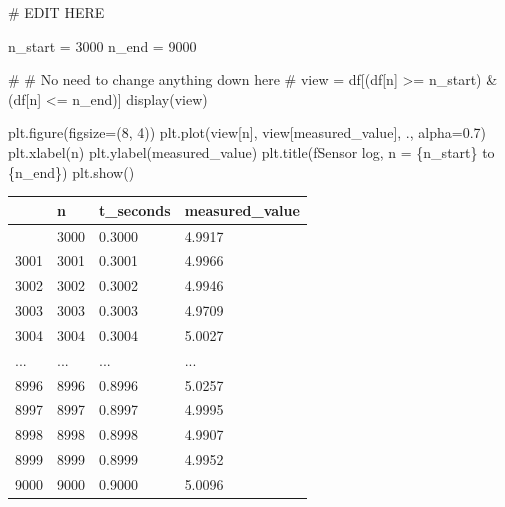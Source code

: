\documentclass[
  letterpaper,
  DIV=11,
  numbers=noendperiod]{scrreprt}
\newenvironment{Shaded}{\begin{snugshade}}{\end{snugshade}}
\newcommand{\CommentTok}[1]{\textcolor[rgb]{0.37,0.37,0.37}{#1}}
\newcommand{\DecValTok}[1]{\textcolor[rgb]{0.68,0.00,0.00}{#1}}
\newcommand{\FloatTok}[1]{\textcolor[rgb]{0.68,0.00,0.00}{#1}}
\newcommand{\NormalTok}[1]{\textcolor[rgb]{0.00,0.23,0.31}{#1}}
\newcommand{\OperatorTok}[1]{\textcolor[rgb]{0.37,0.37,0.37}{#1}}
\newcommand{\SpecialCharTok}[1]{\textcolor[rgb]{0.37,0.37,0.37}{#1}}
\newcommand{\SpecialStringTok}[1]{\textcolor[rgb]{0.13,0.47,0.30}{#1}}
\newcommand{\StringTok}[1]{\textcolor[rgb]{0.13,0.47,0.30}{#1}}
\newcounter{none} %
\theoremstyle{plain}
\theoremstyle{plain}
\theoremstyle{definition}
\theoremstyle{definition}
\theoremstyle{definition}
\theoremstyle{plain}
\theoremstyle{plain}
\theoremstyle{remark}
\begin{document}
\begin{Shaded}
\begin{Highlighting}[]
\CommentTok{\# EDIT HERE}

\NormalTok{n\_start }\OperatorTok{=} \DecValTok{3000}
\NormalTok{n\_end }\OperatorTok{=} \DecValTok{9000}


\CommentTok{\#}
\CommentTok{\# No need to change anything down here}
\CommentTok{\#}
\NormalTok{view }\OperatorTok{=}\NormalTok{ df[(df[}\StringTok{\textquotesingle{}n\textquotesingle{}}\NormalTok{] }\OperatorTok{\textgreater{}=}\NormalTok{ n\_start) }\OperatorTok{\&}\NormalTok{ (df[}\StringTok{\textquotesingle{}n\textquotesingle{}}\NormalTok{] }\OperatorTok{\textless{}=}\NormalTok{ n\_end)]}
\NormalTok{display(view)}

\NormalTok{plt.figure(figsize}\OperatorTok{=}\NormalTok{(}\DecValTok{8}\NormalTok{, }\DecValTok{4}\NormalTok{))}
\NormalTok{plt.plot(view[}\StringTok{\textquotesingle{}n\textquotesingle{}}\NormalTok{], view[}\StringTok{\textquotesingle{}measured\_value\textquotesingle{}}\NormalTok{], }\StringTok{\textquotesingle{}.\textquotesingle{}}\NormalTok{, alpha}\OperatorTok{=}\FloatTok{0.7}\NormalTok{)}
\NormalTok{plt.xlabel(}\StringTok{\textquotesingle{}n\textquotesingle{}}\NormalTok{)}
\NormalTok{plt.ylabel(}\StringTok{\textquotesingle{}measured\_value\textquotesingle{}}\NormalTok{)}
\NormalTok{plt.title(}\SpecialStringTok{f\textquotesingle{}Sensor log, n = }\SpecialCharTok{\{}\NormalTok{n\_start}\SpecialCharTok{\}}\SpecialStringTok{ to }\SpecialCharTok{\{}\NormalTok{n\_end}\SpecialCharTok{\}}\SpecialStringTok{\textquotesingle{}}\NormalTok{)}
\NormalTok{plt.show()}
\end{Highlighting}
\end{Shaded}

{\def\LTcaptype{none} %
\begin{longtable}[]{@{}llll@{}}
\toprule\noalign{}
& n & t\_seconds & measured\_value \\
\midrule\noalign{}
\endhead
\bottomrule\noalign{}
\endlastfoot
3000 & 3000 & 0.3000 & 4.9917 \\
3001 & 3001 & 0.3001 & 4.9966 \\
3002 & 3002 & 0.3002 & 4.9946 \\
3003 & 3003 & 0.3003 & 4.9709 \\
3004 & 3004 & 0.3004 & 5.0027 \\
... & ... & ... & ... \\
8996 & 8996 & 0.8996 & 5.0257 \\
8997 & 8997 & 0.8997 & 4.9995 \\
8998 & 8998 & 0.8998 & 4.9907 \\
8999 & 8999 & 0.8999 & 4.9952 \\
9000 & 9000 & 0.9000 & 5.0096 \\
\end{longtable}
}
\end{document}
